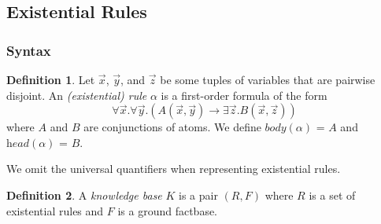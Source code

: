 \documentclass{article}
\newtheorem{proposition}{Proposition}[section]
\theoremstyle{definition}
\newtheorem{definition}{Definition}[section]
\theoremstyle{remark}
\begin{document}




\subsection{Existential Rules}

\subsubsection{Syntax}



\begin{definition}
Let $\vec x$, $\vec y$, and $\vec z$ be some tuples of variables that are pairwise disjoint. An \emph{(existential) rule} $\alpha$ is a first-order formula	of the form $$\forall \vec x.\forall \vec y.( A(\vec x,\vec y) \rightarrow \exists \vec z. B(\vec x,\vec z))$$ where $A$ and $B$ are conjunctions of atoms. We define \emph{$\textit{body}(\alpha)$} = $A$ and \emph{$\textit{head}(\alpha)$} = $B$.
\end{definition}
We omit the universal quantifiers when representing existential rules.
\begin{definition}

A \emph{knowledge base} $K$ is a pair $(R,F)$ where $R$ is a set of existential rules and $F$ is a  ground factbase.
\end{definition}
\end{document}
